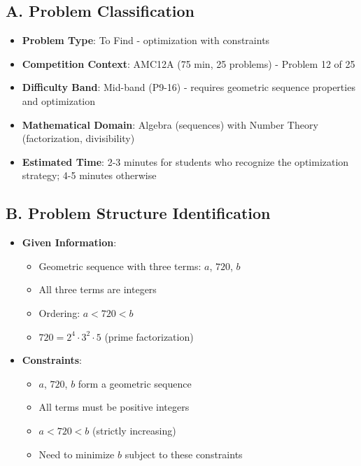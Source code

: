 \documentclass[11pt]{article}
\begin{document}
\begin{problemconfigbox}
\subsection*{A. Problem Classification}
\begin{itemize}[leftmargin=*]
    \item \textbf{Problem Type}: To Find - optimization with constraints
    \item \textbf{Competition Context}: AMC12A (75 min, 25 problems) - Problem 12 of 25
    \item \textbf{Difficulty Band}: Mid-band (P9-16) - requires geometric sequence properties and optimization
    \item \textbf{Mathematical Domain}: Algebra (sequences) with Number Theory (factorization, divisibility)
    \item \textbf{Estimated Time}: 2-3 minutes for students who recognize the optimization strategy; 4-5 minutes otherwise
\end{itemize}

\subsection*{B. Problem Structure Identification}
\begin{itemize}[leftmargin=*]
    \item \textbf{Given Information}: 
    \begin{itemize}
        \item Geometric sequence with three terms: $a$, $720$, $b$
        \item All three terms are integers
        \item Ordering: $a < 720 < b$
        \item $720 = 2^4 \cdot 3^2 \cdot 5$ (prime factorization)
    \end{itemize}
    
    \item \textbf{Constraints}: 
    \begin{itemize}
        \item $a$, $720$, $b$ form a geometric sequence
        \item All terms must be positive integers
        \item $a < 720 < b$ (strictly increasing)
        \item Need to minimize $b$ subject to these constraints
    \end{itemize}
    

\end{itemize}
\end{problemconfigbox}
\end{document}
